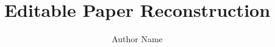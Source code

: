 \documentclass[11pt,letterpaper]{article}
\title{Editable Paper Reconstruction}
\author{Author Name}
\date{}
\begin{document}
\maketitle
\reconstructionnotice



\clearpage

\end{document}
